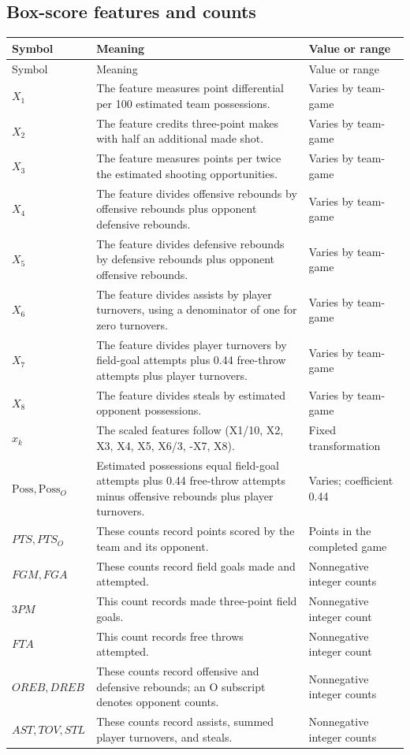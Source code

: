 \documentclass[11pt]{article}
\begin{document}
\subsection*{Box-score features and counts}
\begin{longtable}{@{}>{\raggedright\arraybackslash}p{}>{\raggedright\arraybackslash}p{}>{\raggedright\arraybackslash}p{}@{}}
\toprule
Symbol & Meaning & Value or range\\
\midrule
\endfirsthead
\toprule
Symbol & Meaning & Value or range\\
\midrule
\endhead
\bottomrule
\endfoot
$X_1$ & The feature measures point differential per 100 estimated team possessions. & Varies by team-game\\
$X_2$ & The feature credits three-point makes with half an additional made shot. & Varies by team-game\\
$X_3$ & The feature measures points per twice the estimated shooting opportunities. & Varies by team-game\\
$X_4$ & The feature divides offensive rebounds by offensive rebounds plus opponent defensive rebounds. & Varies by team-game\\
$X_5$ & The feature divides defensive rebounds by defensive rebounds plus opponent offensive rebounds. & Varies by team-game\\
$X_6$ & The feature divides assists by player turnovers, using a denominator of one for zero turnovers. & Varies by team-game\\
$X_7$ & The feature divides player turnovers by field-goal attempts plus 0.44 free-throw attempts plus player turnovers. & Varies by team-game\\
$X_8$ & The feature divides steals by estimated opponent possessions. & Varies by team-game\\
$x_k$ & The scaled features follow (X1/10, X2, X3, X4, X5, X6/3, -X7, X8). & Fixed transformation\\
$\mathrm{Poss},\mathrm{Poss}_O$ & Estimated possessions equal field-goal attempts plus 0.44 free-throw attempts minus offensive rebounds plus player turnovers. & Varies; coefficient 0.44\\
$PTS,PTS_O$ & These counts record points scored by the team and its opponent. & Points in the completed game\\
$FGM,FGA$ & These counts record field goals made and attempted. & Nonnegative integer counts\\
$3PM$ & This count records made three-point field goals. & Nonnegative integer count\\
$FTA$ & This count records free throws attempted. & Nonnegative integer count\\
$OREB,DREB$ & These counts record offensive and defensive rebounds; an O subscript denotes opponent counts. & Nonnegative integer counts\\
$AST,TOV,STL$ & These counts record assists, summed player turnovers, and steals. & Nonnegative integer counts\\
\end{longtable}
\clearpage
\end{document}
